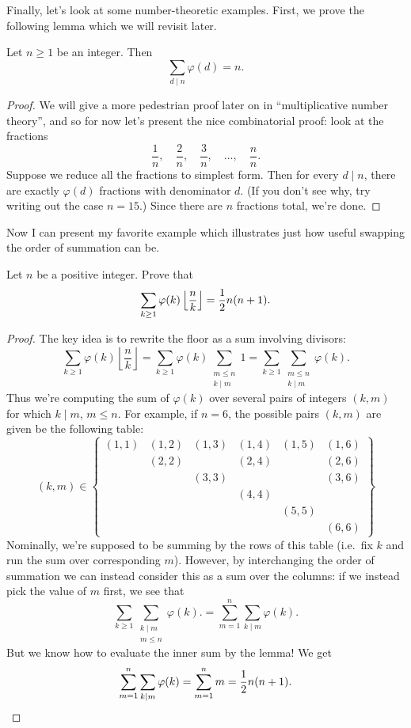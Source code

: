 \documentclass[11pt]{scrartcl}
\begin{document}
Finally, let's look at some number-theoretic examples.
First, we prove the following lemma which we will revisit later.
\begin{lemma}
	[$\varphi \ast \mathbf 1 = \id$]
	Let $n \ge 1$ be an integer.
	Then \[ \sum_{d \mid n} \varphi(d) =  n. \]
\end{lemma}
\begin{proof}
	We will give a more pedestrian proof later on in
	``multiplicative number theory'', and so for now
	let's present the nice combinatorial proof:
	look at the fractions
	\[
		\frac{1}{n}, \quad \frac{2}{n}, \quad \frac{3}{n},
		\quad \dots, \quad \frac{n}{n}.
	\]
	Suppose we reduce all the fractions to simplest form.
	Then for every $d \mid n$,
	there are exactly $\varphi(d)$ fractions with denominator $d$.
	(If you don't see why, try writing out the case $n=15$.)
	Since there are $n$ fractions total, we're done.
\end{proof}
Now I can present my favorite example which illustrates
just how useful swapping the order of summation can be.
\begin{example}
	Let $n$ be a positive integer.
	Prove that
	\[ \sum_{k \ge 1} \varphi(k) \left\lfloor \frac nk \right\rfloor
		= \frac{1}{2} n (n+1).  \]
\end{example}
\begin{proof}
	The key idea is to rewrite the floor as a sum involving divisors:
	\[ \sum_{k \ge 1} \varphi(k) \left\lfloor \frac nk \right\rfloor
		= \sum_{k \ge 1} \varphi(k) \sum_{\substack{m \le n \\ k \mid m}} 1
		= \sum_{k \ge 1} \sum_{\substack{m \le n \\ k \mid m}} \varphi(k).
	\]
	Thus we're computing the sum of $\varphi(k)$
	over several pairs of integers $(k,m)$ for which $k \mid m$, $m \le n$.
	For example, if $n = 6$, the possible pairs $(k,m)$ are given be the following table:
	\[
		(k,m) \in 
		\left\{
		\begin{array}{cccccc}
			(1,1) & (1,2) & (1,3) & (1,4) & (1,5) & (1,6) \\
			& (2,2) && (2,4) && (2,6) \\
			&& (3,3) &&& (3,6) \\
			&&& (4,4) && \\
			&&&& (5,5) & \\
			&&&&& (6,6)
		\end{array}
		\right\}
	\]
	Nominally, we're supposed to be summing by the rows of this table
	(i.e.\ fix $k$ and run the sum over corresponding $m$).
	However, by interchanging the order of summation we can instead
	consider this as a sum over the columns:
	if we instead pick the value of $m$ first, we see that
	\[
		\sum_{k \ge 1} \sum_{\substack{k \mid m \\ m \le n}} \varphi(k).
		= \sum_{m = 1}^n \sum_{k \mid m} \varphi(k).
	\]
	But we know how to evaluate the inner sum by the lemma! We get
	\[ \sum_{m = 1}^n \sum_{k \mid m} \varphi(k)
		= \sum_{m=1}^n m = \frac{1}{2} n(n+1). \qedhere \]
\end{proof}
\end{document}
